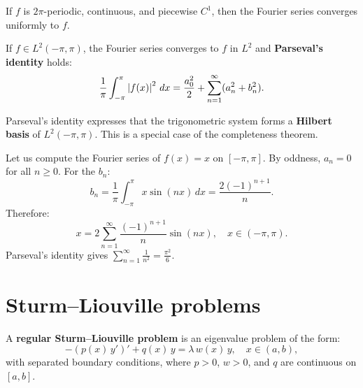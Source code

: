\begin{theorem}
If $f$ is $2\pi$-periodic, continuous, and piecewise $C^1$, then the
Fourier series converges uniformly to $f$.
\end{theorem}

\begin{theorem}\label{thm:parseval}
If $f \in L^2(-\pi, \pi)$, the Fourier series converges to $f$ in $L^2$
and \textbf{Parseval's identity} holds:
\begin{equation}\label{eq:parseval}
    \frac{1}{\pi}\int_{-\pi}^{\pi} \left| f(x) \right|^2\, dx
    = \frac{a_0^2}{2} + \sum_{n=1}^{\infty} (a_n^2 + b_n^2).
\end{equation}
\end{theorem}

\begin{remark}
Parseval's identity expresses that the trigonometric system forms a
\textbf{Hilbert basis} of $L^2(-\pi,\pi)$. This is a special case of the
completeness theorem.
\end{remark}

\begin{example}
Let us compute the Fourier series of $f(x) = x$ on $[-\pi, \pi]$.
By oddness, $a_n = 0$ for all $n \geq 0$. For the $b_n$:
\[
    b_n = \frac{1}{\pi}\int_{-\pi}^{\pi} x \sin(nx)\, dx
    = \frac{2(-1)^{n+1}}{n}.
\]
Therefore:
\[
    x = 2\sum_{n=1}^{\infty} \frac{(-1)^{n+1}}{n}\sin(nx),
    \quad x \in (-\pi, \pi).
\]
Parseval's identity gives $\sum_{n=1}^{\infty} \frac{1}{n^2} = \frac{\pi^2}{6}$.
\end{example}

\section{Sturm--Liouville problems}

\begin{definition}
A \textbf{regular Sturm--Liouville problem} is an eigenvalue problem of the
form:
\begin{equation}\label{eq:sturm_liouville}
    -(p(x)\, y')' + q(x)\, y = \lambda\, w(x)\, y, \quad x \in (a,b),
\end{equation}
with separated boundary conditions, where $p > 0$, $w > 0$, and $q$ are
continuous on $[a,b]$.
\end{definition}

